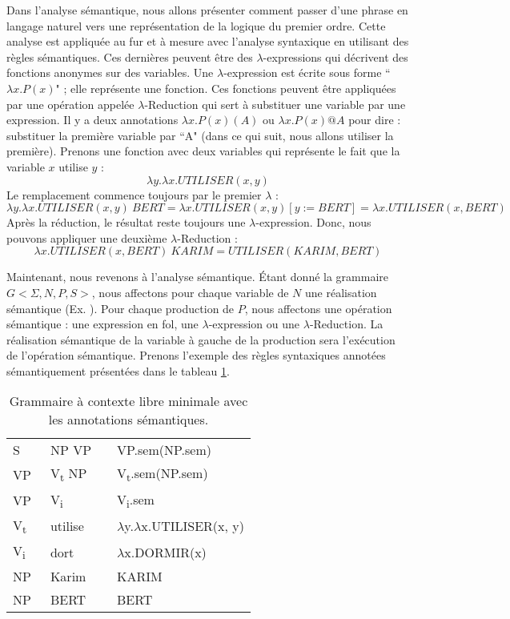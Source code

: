 \documentclass{KodeBook}
\begin{document}
Dans l'analyse sémantique, nous allons présenter comment passer d'une phrase en langage naturel vers une représentation de la logique du premier ordre. 
Cette analyse est appliquée au fur et à mesure avec l'analyse syntaxique en utilisant des règles sémantiques. 
Ces dernières peuvent être des $\lambda $-expressions qui décrivent des fonctions anonymes sur des variables. 
Une $\lambda $-expression est écrite sous forme ``$ \lambda x.P(x)$" ; elle représente une fonction. 
Ces fonctions peuvent être appliquées par une opération appelée $\lambda $-Reduction qui sert à substituer une variable par une expression. 
Il y a deux annotations $ \lambda x.P(x)(A)$ ou $ \lambda x.P(x)@A$ pour dire : substituer la première variable par ``A" (dans ce qui suit, nous allons utiliser la première). 
Prenons une fonction avec deux variables qui représente le fait que la variable $x$ utilise $y$ : 
\[\lambda y.\lambda x.UTILISER(x, y)\]
Le remplacement commence toujours par le premier $\lambda$ :
\[\lambda y.\lambda x.UTILISER(x, y)\ BERT = \lambda x.UTILISER(x, y)[y := BERT] = \lambda x.UTILISER(x, BERT)\] 
Après la réduction, le résultat reste toujours une $\lambda $-expression. 
Donc, nous pouvons appliquer une deuxième $\lambda $-Reduction :
\[\lambda x.UTILISER(x, BERT)\ KARIM = UTILISER(KARIM, BERT)\]

Maintenant, nous revenons à l'analyse sémantique. 
Étant donné la grammaire $G <\Sigma, N, P, S>$, nous affectons pour chaque variable de $N$ une réalisation sémantique (Ex. ). 
Pour chaque production de $P$, nous affectons une opération sémantique : une expression en \ac{fol}, une $\lambda $-expression ou une $\lambda $-Reduction.
La réalisation sémantique  de la variable à gauche de la production sera l'exécution de l'opération sémantique.
Prenons l'exemple des règles syntaxiques annotées sémantiquement présentées dans le tableau \ref{tab:regles-sem1}.

\begin{table}[ht]
	\centering
	\begin{tabular}{llll}
		\hline\hline
		S  & \textrightarrow\ NP VP && VP.sem(NP.sem) \\
		VP & \textrightarrow\ V\textsubscript{t} NP && V\textsubscript{t}.sem(NP.sem)\\
		VP & \textrightarrow\ V\textsubscript{i} && V\textsubscript{i}.sem \\
		V\textsubscript{t}  & \textrightarrow\ utilise && $ \lambda $y.$ \lambda $x.UTILISER(x, y) \\
		V\textsubscript{i}  & \textrightarrow\ dort && $ \lambda $x.DORMIR(x) \\
		NP  & \textrightarrow\  Karim && KARIM \\
		NP  & \textrightarrow\  BERT && BERT \\
		\hline\hline
	\end{tabular}
	\caption{Grammaire à contexte libre minimale avec les annotations sémantiques.}
	\label{tab:regles-sem1}
\end{table}
\end{document}
